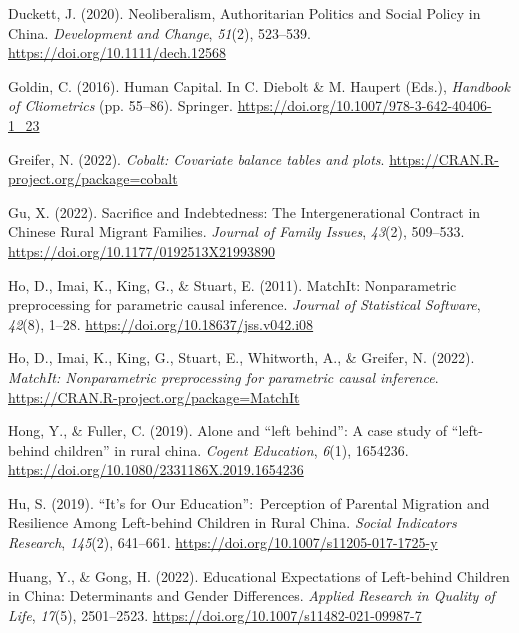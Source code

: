 \documentclass[
  man,floatsintext]{apa7}
\newlength{\cslhangindent}
\newlength{\cslentryspacingunit} %
\newenvironment{CSLReferences}[2] %
 {%
  \setlength{\parindent}{0pt}
  \ifodd #1
  \let\oldpar\par
  \def\par{\hangindent=\cslhangindent\oldpar}
  \fi
  \setlength{\parskip}{#2\cslentryspacingunit}
 }%
 {}
\begin{document}
\begin{CSLReferences}{1}{0}
\leavevmode{}%
Duckett, J. (2020). Neoliberalism, Authoritarian Politics and Social Policy in China. \emph{Development and Change}, \emph{51}(2), 523--539. \url{https://doi.org/10.1111/dech.12568}

\leavevmode{}%
Goldin, C. (2016). Human Capital. In C. Diebolt \& M. Haupert (Eds.), \emph{Handbook of Cliometrics} (pp. 55--86). Springer. \url{https://doi.org/10.1007/978-3-642-40406-1_23}

\leavevmode{}%
Greifer, N. (2022). \emph{Cobalt: Covariate balance tables and plots}. \url{https://CRAN.R-project.org/package=cobalt}

\leavevmode{}%
Gu, X. (2022). Sacrifice and Indebtedness: The Intergenerational Contract in Chinese Rural Migrant Families. \emph{Journal of Family Issues}, \emph{43}(2), 509--533. \url{https://doi.org/10.1177/0192513X21993890}

\leavevmode{}%
Ho, D., Imai, K., King, G., \& Stuart, E. (2011). {MatchIt}: Nonparametric preprocessing for parametric causal inference. \emph{Journal of Statistical Software}, \emph{42}(8), 1--28. \url{https://doi.org/10.18637/jss.v042.i08}

\leavevmode{}%
Ho, D., Imai, K., King, G., Stuart, E., Whitworth, A., \& Greifer, N. (2022). \emph{MatchIt: Nonparametric preprocessing for parametric causal inference}. \url{https://CRAN.R-project.org/package=MatchIt}

\leavevmode{}%
Hong, Y., \& Fuller, C. (2019). Alone and {``}left behind{''}: A case study of {``}left-behind children{''} in rural china. \emph{Cogent Education}, \emph{6}(1), 1654236. \url{https://doi.org/10.1080/2331186X.2019.1654236}

\leavevmode{}%
Hu, S. (2019). {``}It{'}s for Our Education{''}:~Perception of Parental Migration and Resilience Among Left-behind Children in Rural China. \emph{Social Indicators Research}, \emph{145}(2), 641--661. \url{https://doi.org/10.1007/s11205-017-1725-y}

\leavevmode{}%
Huang, Y., \& Gong, H. (2022). Educational Expectations of Left-behind Children in China: Determinants and Gender Differences. \emph{Applied Research in Quality of Life}, \emph{17}(5), 2501--2523. \url{https://doi.org/10.1007/s11482-021-09987-7}


\end{CSLReferences}
\end{document}
